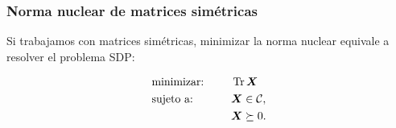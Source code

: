\documentclass[aspectratio=169,12pt,spanish]{beamer}
\begin{document}

\begin{frame}
\frametitle{Norma nuclear de matrices simétricas}

Si trabajamos con matrices simétricas, minimizar la norma nuclear equivale a resolver el problema SDP:

\begin{alignat*}{2}
  & \text{minimizar: } & & \operatorname{Tr} \bm{X} \\
   & \text{sujeto a: } & \quad & \bm{X}  \in \mathcal{C}, \\
   &&& \bm{X} \succeq 0.
\end{alignat*}


\end{frame}
\end{document}
